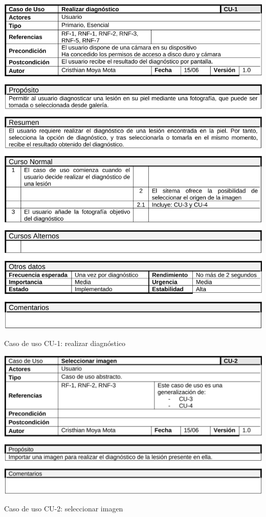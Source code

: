   \begin{table}[H]
	\centering
	\includegraphics[scale=0.33]{imagenes/cu-1.png}
	\caption{Caso de uso CU-1: realizar diagnóstico}
	\label{fig:cu1}
\end{table}


  \begin{table}[H]
	\centering
	\includegraphics[scale=0.4]{imagenes/cu-2.png}
	\caption{Caso de uso CU-2: seleccionar imagen}
	\label{fig:cu2}
\end{table}

